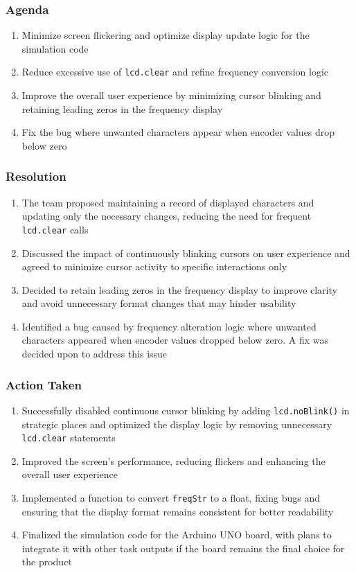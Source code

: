 \documentclass[12pt,a4paper]{article}
\begin{document}
\subsubsection*{Agenda}
\begin{enumerate}
    \item Minimize screen flickering and optimize display update logic for the simulation code
    \item Reduce excessive use of \texttt{lcd.clear} and refine frequency conversion logic
    \item Improve the overall user experience by minimizing cursor blinking and retaining leading zeros in the frequency display
    \item Fix the bug where unwanted characters appear when encoder values drop below zero
\end{enumerate}

\subsubsection*{Resolution}
\begin{enumerate}
    \item The team proposed maintaining a record of displayed characters and updating only the necessary changes, reducing the need for frequent \texttt{lcd.clear} calls
    \item Discussed the impact of continuously blinking cursors on user experience and agreed to minimize cursor activity to specific interactions only
    \item Decided to retain leading zeros in the frequency display to improve clarity and avoid unnecessary format changes that may hinder usability
    \item Identified a bug caused by frequency alteration logic where unwanted characters appeared when encoder values dropped below zero. A fix was decided upon to address this issue
\end{enumerate}

\subsubsection*{Action Taken}
\begin{enumerate}
    \item Successfully disabled continuous cursor blinking by adding \texttt{lcd.noBlink()} in strategic places and optimized the display logic by removing unnecessary \texttt{lcd.clear} statements
    \item Improved the screen's performance, reducing flickers and enhancing the overall user experience
    \item Implemented a function to convert \texttt{freqStr} to a float, fixing bugs and ensuring that the display format remains consistent for better readability
    \item Finalized the simulation code for the Arduino UNO board, with plans to integrate it with other task outputs if the board remains the final choice for the product
\end{enumerate}
\end{document}

